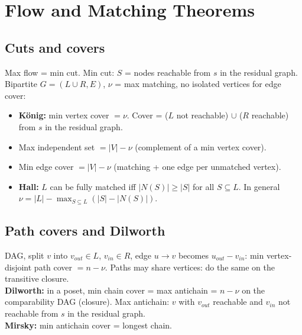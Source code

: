 \section{Flow and Matching Theorems}
	\subsection{Cuts and covers}
		Max flow = min cut. Min cut: $S$ = nodes reachable from $s$ in the residual graph.\\
		Bipartite $G=(L \cup R, E)$, $\nu$ = max matching, no isolated vertices for edge cover:
		\begin{itemize}[noitemsep]
			\item \textbf{König:} min vertex cover $= \nu$. Cover = ($L$ not reachable) $\cup$ ($R$ reachable) from $s$ in the residual graph.
			\item Max independent set $= |V| - \nu$ (complement of a min vertex cover).
			\item Min edge cover $= |V| - \nu$ (matching + one edge per unmatched vertex).
			\item \textbf{Hall:} $L$ can be fully matched iff $|N(S)| \ge |S|$ for all $S \subseteq L$. In general $\nu = |L| - \max_{S \subseteq L}(|S| - |N(S)|)$.
		\end{itemize}

	\subsection{Path covers and Dilworth}
		DAG, split $v$ into $v_{out} \in L$, $v_{in} \in R$, edge $u \to v$ becomes $u_{out} - v_{in}$:
		min vertex-disjoint path cover $= n - \nu$.
		Paths may share vertices: do the same on the transitive closure.\\
		\textbf{Dilworth:} in a poset, min chain cover = max antichain = $n - \nu$ on the comparability DAG (closure).
		Max antichain: $v$ with $v_{out}$ reachable and $v_{in}$ not reachable from $s$ in the residual graph.\\
		\textbf{Mirsky:} min antichain cover = longest chain.

